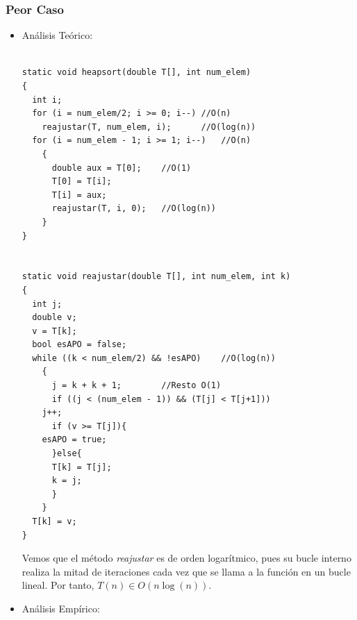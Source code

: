 \documentclass[a4paper,12pt,twoside]{article} %
\begin{document}
	\subsubsection{Peor Caso}
	\begin{itemize}
	
		\item Análisis Teórico:
		
		\lstset{language=C++}
	\begin{lstlisting}
	
static void heapsort(double T[], int num_elem)
{
  int i;
  for (i = num_elem/2; i >= 0; i--)	//O(n)
    reajustar(T, num_elem, i);		//O(log(n))
  for (i = num_elem - 1; i >= 1; i--)	//O(n)
    {
      double aux = T[0];	//O(1)
      T[0] = T[i];
      T[i] = aux;
      reajustar(T, i, 0);	//O(log(n))
    }
}
  

static void reajustar(double T[], int num_elem, int k)
{
  int j;
  double v;
  v = T[k];
  bool esAPO = false;
  while ((k < num_elem/2) && !esAPO)	//O(log(n))
    {
      j = k + k + 1; 		//Resto O(1)
      if ((j < (num_elem - 1)) && (T[j] < T[j+1])) 
	j++;
      if (v >= T[j]){
	esAPO = true;
      }else{
      T[k] = T[j];
      k = j;
      }
    }
  T[k] = v;
}

	\end{lstlisting}
		
		Vemos que el método \textit{reajustar} es de orden logarítmico, pues su bucle interno realiza la mitad de iteraciones cada vez que se llama a la función en un bucle lineal. Por tanto, $T(n) \in O(n \log{(n)})$.
		\item Análisis Empírico:
		

\end{itemize}
\end{document}
